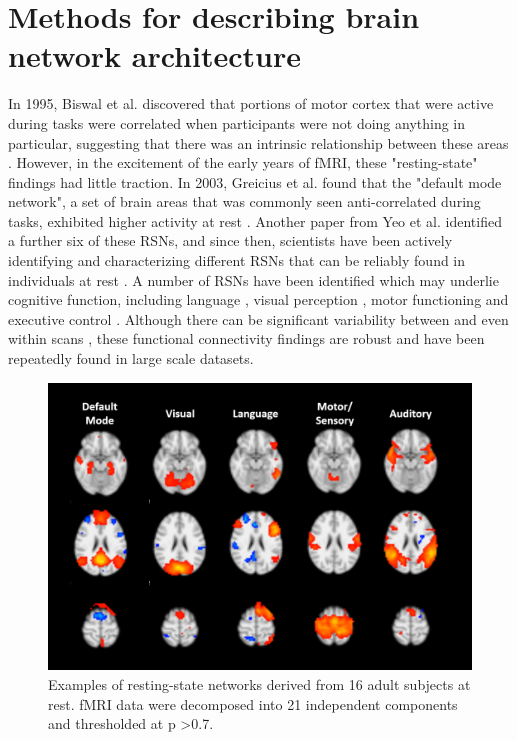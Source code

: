 \section{Methods for describing brain network architecture}

In 1995, Biswal et al. discovered that portions of motor cortex that were active during tasks were correlated when participants were not doing anything in particular, suggesting that there was an intrinsic relationship between these areas \citep{Biswal1995}. However, in the excitement of the early years of fMRI, these "resting-state" findings had little traction. In 2003, Greicius et al. found that the "default mode network", a set of brain areas that was commonly seen anti-correlated during tasks, exhibited higher activity at rest \citep{Greicius2003}. Another paper from Yeo et al. identified a further six of these RSNs, and since then, scientists have been actively identifying and characterizing different RSNs that can be reliably found in individuals at rest \citep{Yeo2008}. A number of RSNs have been identified which may underlie cognitive function, including language \citep{Cordes2000, Hampson2002}, visual perception \citep{Cordes2000, Simmons2012}, motor functioning \citep{Biswal1995} and executive control \citep{Seeley2007, Simmons2012}. Although there can be significant variability between and even within scans \citep{Honey2009}, these functional connectivity findings are robust and have been repeatedly found in large scale datasets.

\begin{figure}[t]
    \centering
    \includegraphics[height=3in]{images/ch1-ica.png}
    \caption[Examples of resting-state networks.]{Examples of resting-state networks derived from 16 adult subjects at rest. fMRI data were decomposed into 21 independent components and thresholded at p \textgreater 0.7.} 
\end{figure}

